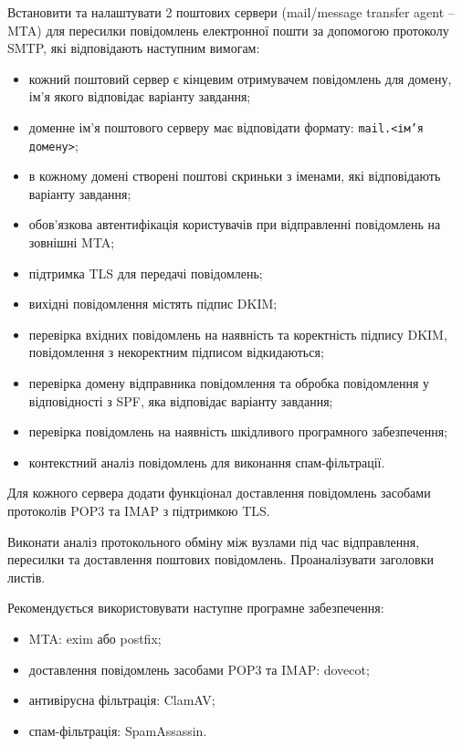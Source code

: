 \documentclass[14pt, a4paper]{extreport}
\begin{document}
	Встановити та налаштувати 2 поштових сервери (mail/message transfer agent -- MTA) для пересилки повідомлень електронної пошти за допомогою протоколу SMTP, які відповідають наступним вимогам:
	
	\begin{itemize}
		\item кожний поштовий сервер є кінцевим отримувачем повідомлень для домену, ім'я якого відповідає варіанту завдання;
		
		\item доменне ім'я поштового серверу має відповідати формату: \texttt{mail.<ім'я домену>};
		
		\item в кожному домені створені поштові скриньки з іменами, які відповідають варіанту завдання;
		
		\item обов'язкова автентифікація користувачів при відправленні повідомлень на зовнішні MTA;
		
		\item підтримка TLS для передачі повідомлень;
		
		\item вихідні повідомлення містять підпис DKIM;
		
		\item перевірка вхідних повідомлень на наявність та коректність підпису DKIM, повідомлення з некоректним підписом відкидаються;
		
		\item перевірка домену відправника повідомлення та обробка повідомлення у відповідності з SPF, яка відповідає варіанту завдання;
		
		\item перевірка повідомлень на наявність шкідливого програмного забезпечення;
		
		\item контекстний аналіз повідомлень для виконання спам-фільтрації.
	\end{itemize}
	
	Для кожного сервера додати функціонал доставлення повідомлень засобами протоколів POP3 та IMAP з підтримкою TLS.
	
	Виконати аналіз протокольного обміну між вузлами під час відправлення, пересилки та доставлення поштових повідомлень. Проаналізувати заголовки листів.
	
	Рекомендується використовувати наступне програмне забезпечення:
	
	\begin{itemize}
		\item MTA: exim або postfix;
		
		\item доставлення повідомлень засобами POP3 та IMAP: dovecot;
		
		\item антивірусна фільтрація: ClamAV;
		
		\item спам-фільтрація: SpamAssassin.
	\end{itemize}
	
\end{document}
